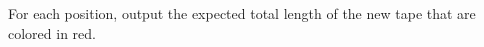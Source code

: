 For each position, output the expected total length of the new tape that are
colored in red.
\newpage
